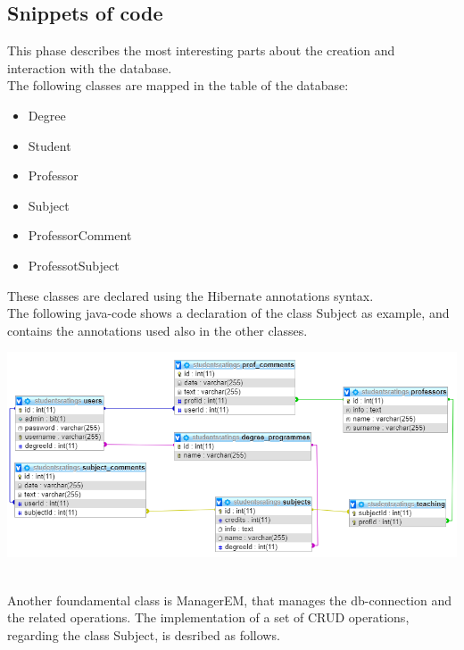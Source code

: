 \documentclass[a4paper, oneside]{article}
\begin{document}
\subsection{Snippets of code}
This phase describes the most interesting parts about the creation and interaction with the database.\\
The following classes are mapped in the table of the database: 

\begin{itemize}	
\item Degree
\item Student
\item Professor
\item Subject
\item ProfessorComment
\item ProfessotSubject
\end{itemize}
These classes are declared using the Hibernate annotations syntax.\\
The following java-code shows a declaration of the class Subject as example, and contains the annotations used also in the other classes.

\vspace{2mm}

\vspace{5mm}

\begin{minipage}{\linewidth}
\begin{center}
\vspace{1mm}
\includegraphics[width=155mm]{./images/diagrams/er_diagram2.png} 
\label{fig:diagramma_er2}
\end{center}
\end{minipage}
\vspace{5mm}\\
 Another foundamental class is ManagerEM, that manages the db-connection and the related operations.
 The implementation of a set of CRUD operations, regarding the class Subject, is desribed as follows.
\end{document}
